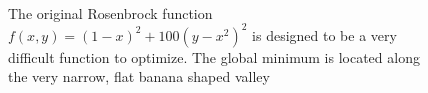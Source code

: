 \begin{figure}
\centering
\mbox{ \quad
{}}
\caption[Original Rosenbrock Function Mesh]{The original Rosenbrock function $f(x,y) = (1 - x)^2 + 100(y - x^2)^2$ is designed to be a very difficult function to optimize. The global minimum is located along the very narrow, flat banana shaped valley \citep{rosenbrock}}
\label{dualgraph}
\end{figure}

